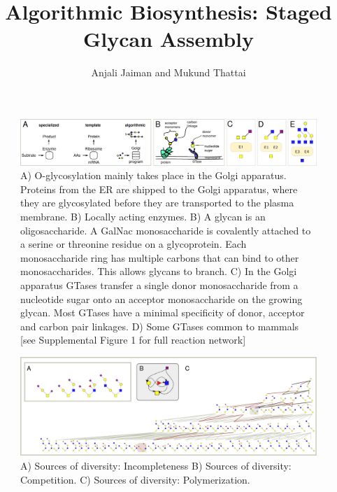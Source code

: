\documentclass{article}
\begin{document}
\graphicspath{ {Images/} }
\sectionfont{\fontsize{11}{0}\selectfont}
\setlength{\headsep}{0pt}


\setlength{\parindent}{0pt}

\title{Algorithmic Biosynthesis: Staged Glycan Assembly}
\author{Anjali Jaiman and Mukund Thattai}
\maketitle



\begin{figure}
    \includegraphics[width=\textwidth]{Figure_1.pdf}
	\caption{A) O-glycosylation mainly takes place in the Golgi apparatus. Proteins from the ER are shipped to the Golgi apparatus, where they are glycosylated before they are transported to the plasma membrane.  B) Locally acting enzymes. B) A glycan is an oligosaccharide. A GalNac monosaccharide is covalently attached to a serine or threonine residue on a glycoprotein. Each monosaccharide ring has multiple carbons that can bind to other monosaccharides. This allows glycans to branch. C) In the Golgi apparatus GTases transfer a single donor monosaccharide from a nucleotide sugar onto an acceptor monosaccharide on the growing glycan. Most GTases have a minimal specificity of donor, acceptor and carbon pair linkages. D) Some GTases common to mammals [see Supplemental Figure 1 for full reaction network]}
\end{figure}  

\begin{figure}
    \includegraphics[width=\textwidth]{Figure_2.pdf}
	\caption{A) Sources of diversity: Incompleteness B) Sources of diversity: Competition. C) Sources of diversity: Polymerization.}
\end{figure}
\end{document}
